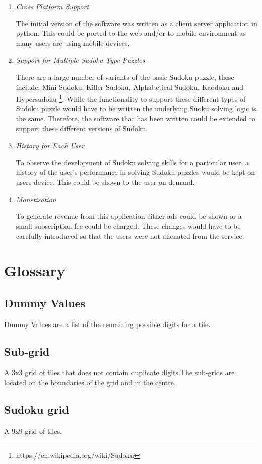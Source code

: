 \documentclass[fleqn]{article}
\begin{document}
\begin{enumerate}
\item{\textit{Cross Platform Support}}

The initial version of the software was written as a client server application in python. This could be ported to the web and/or to mobile environment as many users are using mobile devices.

\item{\textit{Support for Multiple Sudoku Type Puzzles}}

There are a large number of variants of the basic Sudoku puzzle, these include: Mini Sudoku, Killer Sudoku, Alphabetical Sudoku, Kaodoku and Hypersudoku \footnote{https://en.wikipedia.org/wiki/Sudoku}. While the functionality to support these different types of Sudoku puzzle would have to be written the underlying Suoku solving logic is the same. Therefore, the software that has been written could be extended to support these different versions of Sudoku. 

\item{\textit{History for Each User}}

To observe the development of Sudoku solving skills for a particular user, a history of the user's performance in solving Sudoku puzzles would be kept on users device. This could be shown to the user on demand.

\item{\textit{Monetisation}}

To generate revenue from this application either ads could be shown or a small subscription fee could be charged. These changes would have to be carefully introduced so that the users were not alienated from the service. 

\end{enumerate}

\newpage
\section{Glossary}
\subsection*{Dummy Values}
Dummy Values are a list of the remaining possible digits for a tile.
\subsection*{Sub-grid}
A 3x3 grid of tiles that does not contain duplicate digits.The sub-grids are located on the boundaries of the grid and in the centre.
\subsection*{Sudoku grid}
A 9x9 grid of tiles. 
\end{document}

